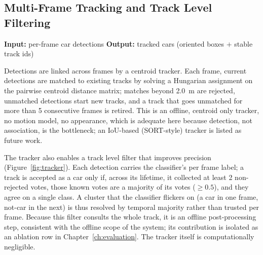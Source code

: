 \documentclass[a4paper,12pt]{report}
\begin{document}
\subsection{Multi-Frame Tracking and Track Level Filtering}
\label{sec:pipeline-tracker}

\noindent \textbf{Input:} per-frame car detections \quad \textbar \quad \textbf{Output:} tracked cars (oriented boxes $+$ stable track ids) \vspace{0.5em}

Detections are linked across frames by a centroid tracker. Each frame, current detections are matched to existing
tracks by solving a Hungarian assignment on the pairwise centroid distance
matrix; matches beyond \SI{2.0}{\meter} are rejected, unmatched detections start
new tracks, and a track that goes unmatched for more than \num{5} consecutive
frames is retired. This is an offline, centroid only tracker, no motion model,
no appearance, which is adequate here because detection, not association, is
the bottleneck; an IoU-based (SORT-style) tracker is listed as future work.

The tracker also enables a track level filter that improves precision
(Figure~\ref{fig:tracker}).
Each detection carries the classifier's per frame label; a track is accepted as a
car only if, across its lifetime, it collected at least \num{2} non-rejected
votes, those known votes are a majority of its votes
($\geq \num{0.5}$), and they agree on a single class. A cluster that the
classifier flickers on (a car in one frame, not-car in the next) is thus
resolved by temporal majority rather than trusted per frame. Because this filter
consults the whole track, it is an offline post-processing step, consistent with
the offline scope of the system; its contribution is isolated as an ablation row
in Chapter~\ref{ch:evaluation}. The tracker itself is computationally negligible.
\end{document}
